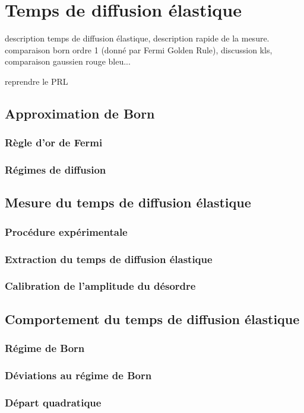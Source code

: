 \chapter{Temps de diffusion élastique}
\label{ch:TauS_PRL}

description temps de diffusion élastique, description rapide de la mesure. comparaison born ordre 1 (donné par Fermi Golden Rule), discussion kls, comparaison gaussien rouge bleu...


reprendre le PRL

\section{Approximation de Born}
\subsection{Règle d'or de Fermi}
\subsection{Régimes de diffusion}

\section{Mesure du temps de diffusion élastique}
\subsection{Procédure expérimentale}
\subsection{Extraction du temps de diffusion élastique}
\subsection{Calibration de l'amplitude du désordre}

\section{Comportement du temps de diffusion élastique}
\subsection{Régime de Born}
\subsection{Déviations au régime de Born}
\subsection{Départ quadratique}